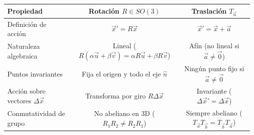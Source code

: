 \documentclass[11pt,letterpaper]{article}
\begin{document}
\begin{center}
\small
\begin{tabular}{|l|c|c|}
\hline
\textbf{Propiedad} & \textbf{Rotación $R \in SO(3)$} & \textbf{Traslación $T_{\vec{a}}$} \\ \hline
Definición de acción & $\vec{x}' = R\vec{x}$ & $\vec{x}' = \vec{x} + \vec{a}$ \\ \hline
Naturaleza algebraica & Lineal ($R(\alpha\vec{u}+\beta\vec{v})=\alpha R\vec{u}+\beta R\vec{v}$) & Afín (no lineal si $\vec{a}\neq\vec{0}$) \\ \hline
Puntos invariantes & Fija el origen y todo el eje $\hat{n}$ & Ningún punto fijo si $\vec{a}\neq\vec{0}$ \\ \hline
Acción sobre vectores $\Delta\vec{x}$ & Transforma por giro $R\Delta\vec{x}$ & Invariante ($\Delta\vec{x}' = \Delta\vec{x}$) \\ \hline
Conmutatividad de grupo & No abeliano en 3D ($R_1 R_2 \neq R_2 R_1$) & Siempre abeliano ($T_{\vec{a}}T_{\vec{b}} = T_{\vec{b}}T_{\vec{a}}$) \\ \hline
\end{tabular}
\end{center}
\end{document}
